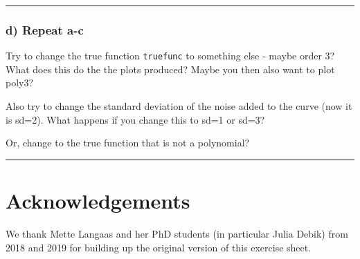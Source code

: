 \documentclass[]{article}
\begin{document}
\begin{center}\rule{0.5\linewidth}{0.5pt}\end{center}

\hypertarget{d-repeat-a-c}{%
\subsubsection{d) Repeat a-c}\label{d-repeat-a-c}}

Try to change the true function \texttt{truefunc} to something else -
maybe order 3? What does this do the the plots produced? Maybe you then
also want to plot poly3?

Also try to change the standard deviation of the noise added to the
curve (now it is sd=2). What happens if you change this to sd=1 or sd=3?

Or, change to the true function that is not a polynomial?

\begin{center}\rule{0.5\linewidth}{0.5pt}\end{center}

\hypertarget{acknowledgements}{%
\section{Acknowledgements}\label{acknowledgements}}

We thank Mette Langaas and her PhD students (in particular Julia Debik)
from 2018 and 2019 for building up the original version of this exercise
sheet.
\end{document}
